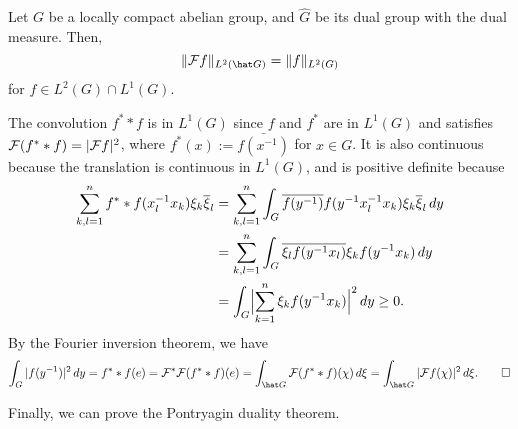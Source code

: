 \documentclass{../../small}
\begin{document}
\begin{thm}
Let $G$ be a locally compact abelian group, and $\hat G$ be its dual group with the dual measure.
Then,
\[\|\cF f\|_{L^2(\hat G)}=\|f\|_{L^2(G)}\]
for $f\in L^2(G)\cap L^1(G)$.
\end{thm}
\begin{pf}
The convolution $f^**f$ is in $L^1(G)$ since $f$ and $f^*$ are in $L^1(G)$ and satisfies $\cF(f^**f)=|\cF f|^2$, where $f^*(x):=\bar{f(x^{-1})}$ for $x\in G$.
It is also continuous because the translation is continuous in $L^1(G)$, and is positive definite because
\begin{align*}
\sum_{k,l=1}^nf^**f(x_l^{-1}x_k)\xi_k\bar\xi_l
&=\sum_{k,l=1}^n\int_G\bar{f(y^{-1})}f(y^{-1}x_l^{-1}x_k)\xi_k\bar\xi_l\,dy\\
&=\sum_{k,l=1}^n\int_G\bar{\xi_lf(y^{-1}x_l)}\xi_kf(y^{-1}x_k)\,dy\\
&=\int_G\Bigl|\sum_{k=1}^n\xi_kf(y^{-1}x_k)\Bigr|^2\,dy\ge0.
\end{align*}
By the Fourier inversion theorem, we have
\[\int_G|f(y^{-1})|^2\,dy=f^**f(e)=\cF^*\cF(f^**f)(e)=\int_{\hat G}\cF(f^**f)(\chi)\,d\xi=\int_{\hat G}|\cF f(\chi)|^2\,d\xi.\qedhere\]
\end{pf}

Finally, we can prove the Pontryagin duality theorem.
\end{document}
